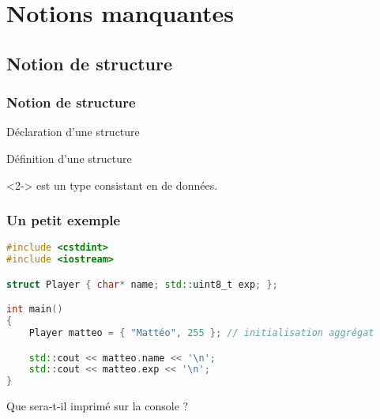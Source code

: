 \documentclass{cppcourses}
\begin{document}
\section{Notions manquantes}

\subsection{Notion de structure}

\begin{frame}

\frametitle{Notion de structure}

\begin{myfigure}
\caption{Déclaration d'une structure}
\end{myfigure}

\begin{myfigure}
\caption{Définition d'une structure}
\end{myfigure}

\begin{definition}<2->
 est un type consistant en  de données.
\end{definition}

\end{frame}

\begin{frame}[fragile]

\frametitle{Un petit exemple}

\begin{example}

\begin{lstlisting}[language = c++]
#include <cstdint>
#include <iostream>

struct Player { char* name; std::uint8_t exp; };

int main()
{
    Player matteo = { "Mattéo", 255 }; // initialisation aggrégat

    std::cout << matteo.name << '\n';
    std::cout << matteo.exp << '\n';
}
\end{lstlisting}

Que sera-t-il imprimé sur la console ?


\end{example}

\end{frame}
\end{document}
